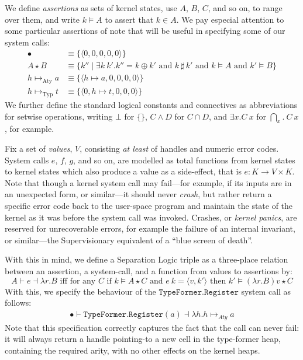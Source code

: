 \documentclass[a4paper, UKenglish, cleveref, autoref, thm-restate, colorlinks]{lipics-v2021}
\newcommand{\lam}[1]{\lambda{#1}.}
\newcommand{\xsts}[1]{\exists{#1}.}
\begin{document}
We define \emph{assertions} as sets of kernel states, use $A$, $B$, $C$, and so on, to range over them, and write $k \vDash A$ to assert that $k \in A$.
We pay especial attention to some particular assertions of note that will be useful in specifying some of our system calls:
\begin{align*}
\bullet                  &\equiv \{ \langle 0, 0, 0, 0, 0 \rangle \} \\
A \star B                &\equiv \{ k'' \mid \xsts{k\ k'}k'' = k \oplus k' \text{ and } k\ \sharp\ k' \text{ and } k \vDash A \text{ and } k' \vDash B \} \\
h \mapsto_{\text{Aty}} a &\equiv \{ \langle h \mapsto a, 0, 0, 0, 0 \rangle \} \\
h \mapsto_{\text{Typ}} t &\equiv \{ \langle 0, h \mapsto t, 0, 0, 0 \rangle \}
\end{align*}
We further define the standard logical constants and connectives as abbreviations for setwise operations, writing $\bot$ for $\{\}$, $C \wedge D$ for $C \cap D$, and $\xsts{x}C\ x$ for $\bigcap_x.\ C\ x$, for example.

Fix a set of \emph{values}, $V$, consisting \emph{at least} of handles and numeric error codes.
System calls $e$, $f$, $g$, and so on, are modelled as total functions from kernel states to kernel states which also produce a value as a side-effect, that is $e : K \rightarrow V \times K$.
Note that though a kernel system call may fail---for example, if its inputs are in an unexpected form, or similar---it should never \emph{crash}, but rather return a specific error code back to the user-space program and maintain the state of the kernel as it was before the system call was invoked.
Crashes, or \emph{kernel panics}, are reserved for unrecoverable errors, for example the failure of an internal invariant, or similar---the Supervisionary equivalent of a ``blue screen of death''.

With this in mind, we define a Separation Logic triple as a three-place relation between an assertion, a system-call, and a function from values to assertions by:
\begin{displaymath}
A \vdash e \dashv \lam{r}B \text{ iff for any } C \text{ if } k \vDash A \star C \text{ and } e\ k = \langle v, k' \rangle \text{ then } k' \vDash (\lam{r}B)v \star C
\end{displaymath}
With this, we specify the behaviour of the $\mathtt{TypeFormer.Register}$ system call as follows:
\begin{gather*}
\bullet \vdash \mathtt{TypeFormer.Register}(a) \dashv \lam{h}h \mapsto_{Aty} a
\end{gather*}
Note that this specification correctly captures the fact that the call can never fail: it will always return a handle pointing-to a new cell in the type-former heap, containing the required arity, with no other effects on the kernel heaps.
\end{document}
